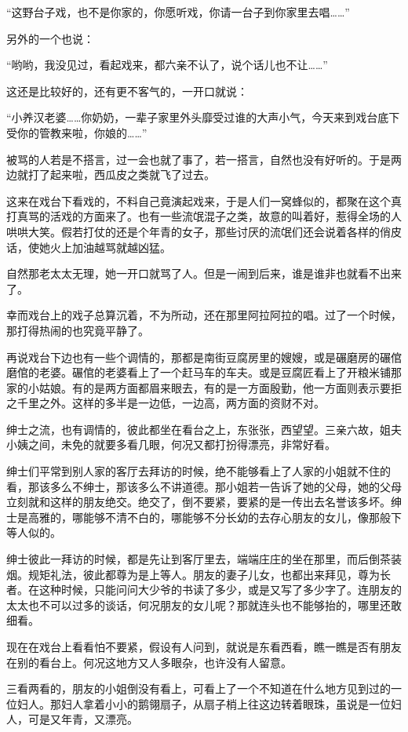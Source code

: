 \par “这野台子戏，也不是你家的，你愿听戏，你请一台子到你家里去唱……”
\par 另外的一个也说：
\par “哟哟，我没见过，看起戏来，都六亲不认了，说个话儿也不让……”
\par 这还是比较好的，还有更不客气的，一开口就说：
\par “小养汉老婆……你奶奶，一辈子家里外头靡受过谁的大声小气，今天来到戏台底下受你的管教来啦，你娘的……”
\par 被骂的人若是不搭言，过一会也就了事了，若一搭言，自然也没有好听的。于是两边就打了起来啦，西瓜皮之类就飞了过去。
\par 这来在戏台下看戏的，不料自己竟演起戏来，于是人们一窝蜂似的，都聚在这个真打真骂的活戏的方面来了。也有一些流氓混子之类，故意的叫着好，惹得全场的人哄哄大笑。假若打仗的还是个年青的女子，那些讨厌的流氓们还会说着各样的俏皮话，使她火上加油越骂就越凶猛。
\par 自然那老太太无理，她一开口就骂了人。但是一闹到后来，谁是谁非也就看不出来了。
\par 幸而戏台上的戏子总算沉着，不为所动，还在那里阿拉阿拉的唱。过了一个时候，那打得热闹的也究竟平静了。
\par 再说戏台下边也有一些个调情的，那都是南街豆腐房里的嫂嫂，或是碾磨房的碾倌磨倌的老婆。碾倌的老婆看上了一个赶马车的车夫。或是豆腐匠看上了开粮米铺那家的小姑娘。有的是两方面都眉来眼去，有的是一方面殷勤，他一方面则表示要拒之千里之外。这样的多半是一边低，一边高，两方面的资财不对。
\par 绅士之流，也有调情的，彼此都坐在看台之上，东张张，西望望。三亲六故，姐夫小姨之间，未免的就要多看几眼，何况又都打扮得漂亮，非常好看。
\par 绅士们平常到别人家的客厅去拜访的时候，绝不能够看上了人家的小姐就不住的看，那该多么不绅士，那该多么不讲道德。那小姐若一告诉了她的父母，她的父母立刻就和这样的朋友绝交。绝交了，倒不要紧，要紧的是一传出去名誉该多坏。绅士是高雅的，哪能够不清不白的，哪能够不分长幼的去存心朋友的女儿，像那般下等人似的。
\par 绅士彼此一拜访的时候，都是先让到客厅里去，端端庄庄的坐在那里，而后倒茶装烟。规矩礼法，彼此都尊为是上等人。朋友的妻子儿女，也都出来拜见，尊为长者。在这种时候，只能问问大少爷的书读了多少，或是又写了多少字了。连朋友的太太也不可以过多的谈话，何况朋友的女儿呢？那就连头也不能够抬的，哪里还敢细看。
\par 现在在戏台上看看怕不要紧，假设有人问到，就说是东看西看，瞧一瞧是否有朋友在别的看台上。何况这地方又人多眼杂，也许没有人留意。
\par 三看两看的，朋友的小姐倒没有看上，可看上了一个不知道在什么地方见到过的一位妇人。那妇人拿着小小的鹅翎扇子，从扇子梢上往这边转着眼珠，虽说是一位妇人，可是又年青，又漂亮。
